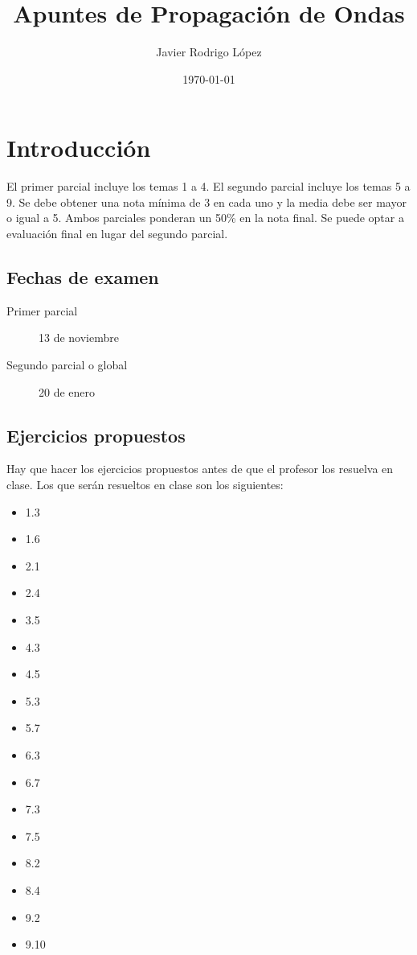 \documentclass[12pt, a4paper]{article}
\title{Apuntes de Propagación de Ondas}
\author{Javier Rodrigo López}
\date{\today}
\begin{document}
\maketitle

\tableofcontents

\newpage
\section*{Introducción}

El primer parcial incluye los temas 1 a 4. El segundo parcial incluye los temas 5 a 9. Se debe obtener una nota mínima de 3 en cada uno y la media debe ser mayor o igual a 5. Ambos parciales ponderan un 50\% en la nota final. Se puede optar a evaluación final en lugar del segundo parcial.

\subsection*{Fechas de examen}

\begin{description}
    \item [Primer parcial] 13 de noviembre
    \item [Segundo parcial o global] 20 de enero
\end{description}

\subsection*{Ejercicios propuestos}
Hay que hacer los ejercicios propuestos antes de que el profesor los resuelva en clase. Los que serán resueltos en clase son los siguientes:
\begin{multicols}{5}
    \begin{itemize}
        \item 1.3
        \item 1.6
        \item 2.1
        \item 2.4
        \item 3.5
        \item 4.3
        \item 4.5
        \item 5.3
        \item 5.7
        \item 6.3
        \item 6.7
        \item 7.3
        \item 7.5
        \item 8.2
        \item 8.4
        \item 9.2
        \item 9.10
    \end{itemize}
\end{multicols}
\end{document}
